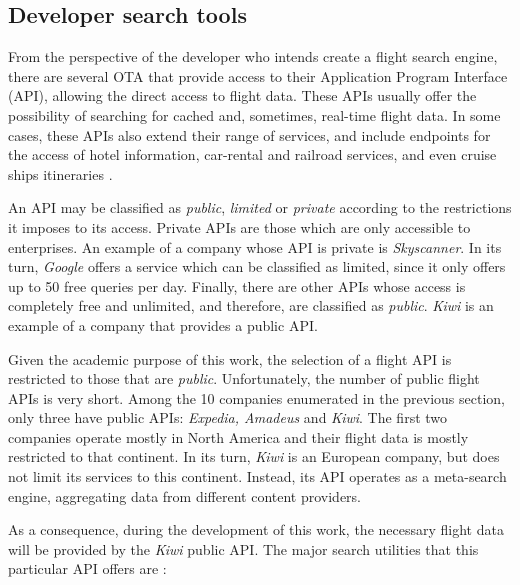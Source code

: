 \subsection{Developer search tools}
\label{sec:developer_st}

From the perspective of the developer who intends create a flight search engine, there are several OTA that provide access to their Application Program Interface (API), allowing the direct access to flight data. These APIs usually offer the possibility of searching for cached and, sometimes, real-time flight data. In some cases, these APIs also extend their range of services, and include endpoints for the access of hotel information, car-rental and railroad services, and even cruise ships itineraries \cite{expedia_docs, amadeus}.

An API may be classified as \textit{public}, \textit{limited} or \textit{private} according to the restrictions it imposes to its access. Private APIs are those which are only accessible to enterprises. An example of a company whose API is private is \textit{Skyscanner}. In its turn, \textit{Google} offers a service which can be classified as limited, since it only offers up to 50 free queries per day. Finally, there are other APIs whose access is completely free and unlimited, and therefore, are classified as \textit{public}. \textit{Kiwi} is an example of a company that provides a public API.

Given the academic purpose of this work, the selection of a flight API is restricted to those that are \textit{public}. Unfortunately, the number of public flight APIs is very short. Among the 10 companies enumerated in the previous section, only three have public APIs: \textit{Expedia, Amadeus} and \textit{Kiwi}. The first two companies operate mostly in North America and their flight data is mostly restricted to that continent. In its turn, \textit{Kiwi} is an European company, but does not limit its services to this continent. Instead, its API operates as a meta-search engine, aggregating data from different content providers. 

As a consequence, during the development of this work, the necessary flight data will be provided by the \textit{Kiwi} public API. The major search utilities that this particular API offers are \cite{kiwi_api}:

